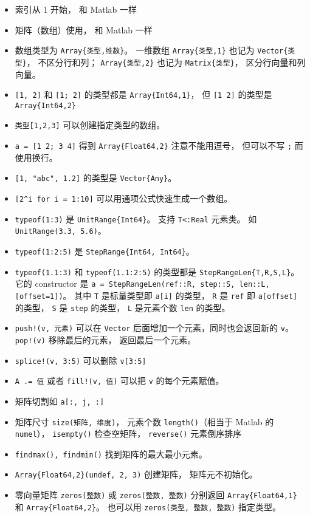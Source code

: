\begin{itemize}
\item 索引从 1 开始， 和 Matlab 一样
\item 矩阵（数组）使用， 和 Matlab 一样
\item 数组类型为 \verb`Array{类型,维数}`。 一维数组 \verb`Array{类型,1}` 也记为 \verb`Vector{类型}`， 不区分行和列； \verb`Array{类型,2}` 也记为 \verb`Matrix{类型}`， 区分行向量和列向量。
\item \verb`[1, 2]` 和 \verb`[1; 2]` 的类型都是 \verb`Array{Int64,1}`， 但 \verb`[1 2]` 的类型是 \verb`Array{Int64,2}`
\item \verb`类型[1,2,3]` 可以创建指定类型的数组。
\item \verb`a = [1 2; 3 4]` 得到 \verb`Array{Float64,2}` 注意不能用逗号， 但可以不写 \verb`;` 而使用换行。
\item \verb`[1, "abc", 1.2]` 的类型是 \verb`Vector{Any}`。
\item \verb`[2^i for i = 1:10]` 可以用通项公式快速生成一个数组。
\item \verb`typeof(1:3)` 是 \verb`UnitRange{Int64}`。 支持 \verb`T<:Real` 元素类。 如 \verb`UnitRange(3.3, 5.6)`。
\item \verb`typeof(1:2:5)` 是 \verb`StepRange{Int64, Int64}`。
\item \verb`typeof(1.1:3)` 和 \verb`typeof(1.1:2:5)` 的类型都是 \verb`StepRangeLen{T,R,S,L}`。 它的 constructor 是 \verb`a = StepRangeLen(ref::R, step::S, len::L, [offset=1])`。 其中 \verb`T` 是标量类型即 \verb`a[i]` 的类型， \verb`R` 是 \verb`ref` 即 \verb`a[offset]` 的类型， \verb`S` 是 \verb`step` 的类型， \verb`L` 是元素个数 \verb`len` 的类型。
\item \verb`push!(v, 元素)` 可以在 \verb`Vector` 后面增加一个元素，同时也会返回新的 \verb`v`。 \verb`pop!(v)` 移除最后的元素， 返回最后一个元素。
\item \verb`splice!(v, 3:5)` 可以删除 \verb`v[3:5]`
\item \verb`A .= 值` 或者 \verb`fill!(v, 值)` 可以把 \verb`v` 的每个元素赋值。
\item 矩阵切割如 \verb`a[:, j, :]`
\item 矩阵尺寸 \verb`size(矩阵, 维度)`， 元素个数 \verb`length()`（相当于 Matlab 的 \verb`numel`）， \verb`isempty()` 检查空矩阵， \verb`reverse()` 元素倒序排序
\item \verb`findmax(), findmin()` 找到矩阵的最大最小元素。
\item \verb`Array{Float64,2}(undef, 2, 3)` 创建矩阵， 矩阵元不初始化。
\item 零向量矩阵 \verb`zeros(整数)` 或 \verb`zeros(整数, 整数)` 分别返回 \verb`Array{Float64,1}` 和 \verb`Array{Float64,2}`。 也可以用 \verb`zeros(类型, 整数, 整数)` 指定类型。

\end{itemize}
